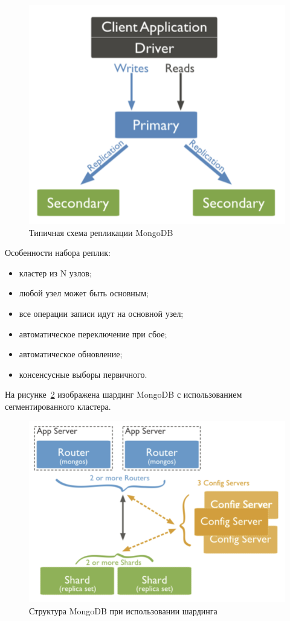 \begin{figure}[H]
    \centering
    \includegraphics{2}
    \caption{Типичная схема репликации MongoDB}
    \label{fig:2}
\end{figure}

Особенности набора реплик:
\begin{itemize}
	\item кластер из N узлов;
	\item любой узел может быть основным;
	\item все операции записи идут на основной узел;
	\item автоматическое переключение при сбое;
	\item автоматическое обновление;
	\item консенсусные выборы первичного.
\end{itemize}

На рисунке~\ref{fig:3} изображена шардинг MongoDB с использованием сегментированного кластера.

\begin{figure}[H]
    \centering
    \includegraphics{3}
    \caption{Структура MongoDB при использовании шардинга}
    \label{fig:3}
\end{figure}

